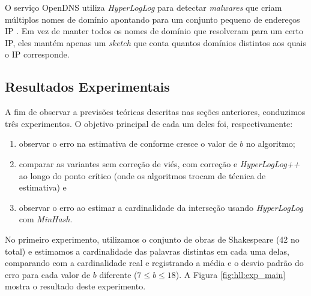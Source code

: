 \begin{description}
O serviço OpenDNS utiliza \emph{HyperLogLog} para detectar \emph{malwares} que criam múltiplos nomes de domínio apontando para um conjunto pequeno de endereços IP \cite{opendns2015hyperloglog}. Em vez de manter todos os nomes de domínio que resolveram para um certo IP, eles mantém apenas um \emph{sketch} que conta quantos domínios distintos aos quais o IP corresponde.


\end{description}

\subsection{Resultados Experimentais}\label{sec:hll:experiments}

A fim de observar a previsões teóricas descritas nas seções anteriores, conduzimos três experimentos. O objetivo principal de cada um deles foi, respectivamente:

\begin{enumerate}
  \item observar o erro na estimativa de conforme cresce o valor de $b$ no algoritmo;
  \item comparar as variantes sem correção de viés, com correção e \emph{HyperLogLog++} ao longo do ponto crítico (onde os algoritmos trocam de técnica de estimativa) e
  \item observar o erro ao estimar a cardinalidade da interseção usando \emph{HyperLogLog} com \emph{MinHash}.
\end{enumerate}

No primeiro experimento, utilizamos o conjunto de obras de Shakespeare (42 no total) e estimamos a cardinalidade das palavras distintas em cada uma delas, comparando com a cardinalidade real e registrando a média e o desvio padrão do erro para cada valor de $b$ diferente ($7 \leq b \leq 18$). A Figura \ref{fig:hll:exp_main} mostra o resultado deste experimento.

